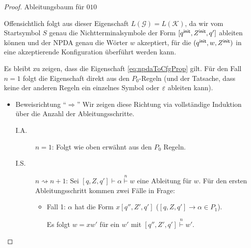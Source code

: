 \begin{proof}
    Ableitungsbaum für $010$
    
    
    Offensichtlich folgt aus dieser Eigenschaft $L(\mathcal{G}) = L(\mathcal{K})$, da wir vom Startsymbol $S$ genau die Nichtterminalsymbole der Form
    $[q^\mathsf{init}, Z^\mathsf{init}, q']$ ableiten können und der \ac{NPDA} genau die Wörter $w$ akzeptiert, für die  $(q^\mathsf{init}, w, Z^\mathsf{init})$ in eine akzeptierende Konfiguration überführt werden kann.
    
    Es bleibt zu zeigen, dass die Eigenschaft \eqref{eq:npdaToCfgProp} gilt.
    Für den Fall $n=1$ folgt die Eigenschaft direkt aus den $P_0$-Regeln (und der Tatsache, dass keine der anderen Regeln ein einzelnes Symbol oder $\varepsilon$ ableiten kann).
    
    \begin{itemize}
     \item Beweisrichtung ``$\Rightarrow$''
     Wir zeigen diese Richtung via vollständige Induktion über die Anzahl der Ableitungsschritte.
     \begin{description}
      \item[I.A.] $n=1$: Folgt wie oben erwähnt aus den $P_0$ Regeln.
      \item[I.S.] $n\rightsquigarrow n+1$:
      Sei $[q,Z,q']\vdash\alpha\stackrel{n}{\vdash} w$ eine Ableitung für $w$. Für den ersten Ableitungsschritt kommen zwei Fälle in Frage:
      \begin{itemize}
      \item Fall 1: $\alpha$ hat die Form $x[q'', Z', q']$ ($[q,Z,q']\rightarrow\alpha \in P_1$).
      
	  Es folgt $w = xw'$ für ein $w'$ mit $[q'', Z', q']\stackrel{n}{\vdash} w'$.
	  

\end{itemize}
\end{description}
\end{itemize}
\end{proof}
